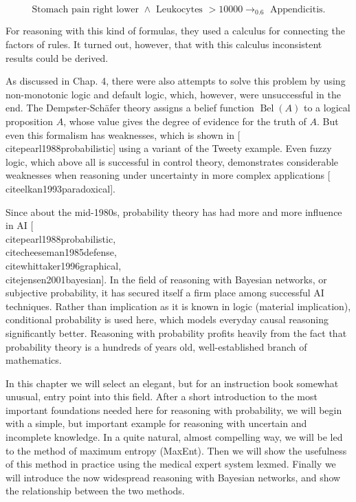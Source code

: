 \documentclass[10pt]{book}
\begin{document}
$$
\text { Stomach pain right lower } \wedge \text { Leukocytes }>10000 \rightarrow_{0.6} \text { Appendicitis. }
$$

For reasoning with this kind of formulas, they used a calculus for connecting the factors of rules. It turned out, however, that with this calculus inconsistent results could be derived.

As discussed in Chap. 4, there were also attempts to solve this problem by using non-monotonic logic and default logic, which, however, were unsuccessful in the end. The Dempster-Schäfer theory assigns a belief function $\operatorname{Bel}(A)$ to a logical proposition $A$, whose value gives the degree of evidence for the truth of $A$. But even this formalism has weaknesses, which is shown in [\\cite{pearl1988probabilistic}] using a variant of the Tweety example. Even fuzzy logic, which above all is successful in control theory, demonstrates considerable weaknesses when reasoning under uncertainty in more complex applications [\\cite{elkan1993paradoxical}].


Since about the mid-1980s, probability theory has had more and more influence in AI [\\cite{pearl1988probabilistic}, \\cite{cheeseman1985defense}, \\cite{whittaker1996graphical}, \\cite{jensen2001bayesian}]. In the field of reasoning with Bayesian networks, or subjective probability, it has secured itself a firm place among successful AI techniques. Rather than implication as it is known in logic (material implication), conditional probability is used here, which models everyday causal reasoning significantly better. Reasoning with probability profits heavily from the fact that probability theory is a hundreds of years old, well-established branch of mathematics.

In this chapter we will select an elegant, but for an instruction book somewhat unusual, entry point into this field. After a short introduction to the most important foundations needed here for reasoning with probability, we will begin with a simple, but important example for reasoning with uncertain and incomplete knowledge. In a quite natural, almost compelling way, we will be led to the method of maximum entropy (MaxEnt). Then we will show the usefulness of this method in practice using the medical expert system lexmed. Finally we will introduce the now widespread reasoning with Bayesian networks, and show the relationship between the two methods.
\end{document}
